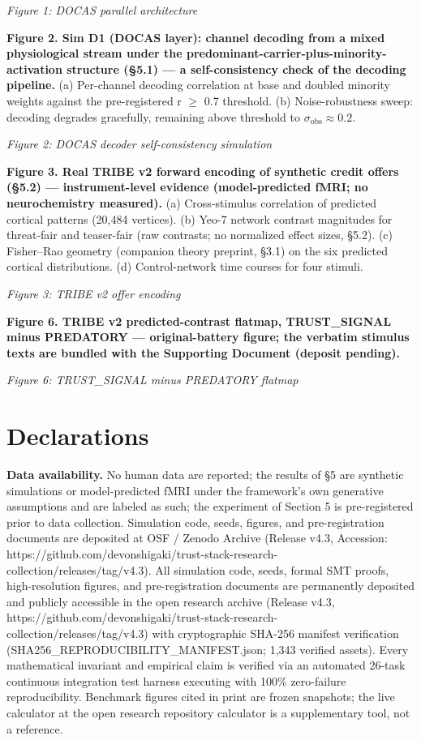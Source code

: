 \documentclass[
]{article}
\begin{document}
\emph{Figure 1: DOCAS parallel architecture}

\textbf{Figure 2. Sim D1 (DOCAS layer): channel decoding from a mixed
physiological stream under the
predominant-carrier-plus-minority-activation structure (§5.1) --- a
self-consistency check of the decoding pipeline.} (a) Per-channel
decoding correlation at base and doubled minority weights against the
pre-registered r \(\geq\) 0.7 threshold. (b) Noise-robustness sweep:
decoding degrades gracefully, remaining above threshold to
\(\sigma_{\mathrm{obs}} \approx 0.2\).

\emph{Figure 2: DOCAS decoder self-consistency simulation}

\textbf{Figure 3. Real TRIBE v2 forward encoding of synthetic credit
offers (§5.2) --- instrument-level evidence (model-predicted fMRI; no
neurochemistry measured).} (a) Cross-stimulus correlation of predicted
cortical patterns (20,484 vertices). (b) Yeo-7 network contrast
magnitudes for threat-fair and teaser-fair (raw contrasts; no normalized
effect sizes, §5.2). (c) Fisher--Rao geometry (companion theory
preprint, §3.1) on the six predicted cortical distributions. (d)
Control-network time courses for four stimuli.

\emph{Figure 3: TRIBE v2 offer encoding}

\textbf{Figure 6. TRIBE v2 predicted-contrast flatmap, TRUST\_SIGNAL
minus PREDATORY --- original-battery figure; the verbatim stimulus texts
are bundled with the Supporting Document (deposit pending).}

\emph{Figure 6: TRUST\_SIGNAL minus PREDATORY flatmap}

\section{Declarations}\label{declarations}

\textbf{Data availability.} No human data are reported; the results of
§5 are synthetic simulations or model-predicted fMRI under the
framework's own generative assumptions and are labeled as such; the
experiment of Section 5 is pre-registered prior to data collection.
Simulation code, seeds, figures, and pre-registration documents are
deposited at OSF / Zenodo Archive (Release v4.3, Accession:
https://github.com/devonshigaki/trust-stack-research-collection/releases/tag/v4.3).
All simulation code, seeds, formal SMT proofs, high-resolution figures,
and pre-registration documents are permanently deposited and publicly
accessible in the open research archive (Release v4.3,
https://github.com/devonshigaki/trust-stack-research-collection/releases/tag/v4.3)
with cryptographic SHA-256 manifest verification
(SHA256\_REPRODUCIBILITY\_MANIFEST.json; 1,343 verified assets). Every
mathematical invariant and empirical claim is verified via an automated
26-task continuous integration test harness executing with 100\%
zero-failure reproducibility. Benchmark figures cited in print are
frozen snapshots; the live calculator at the open research repository
calculator is a supplementary tool, not a reference.
\end{document}

